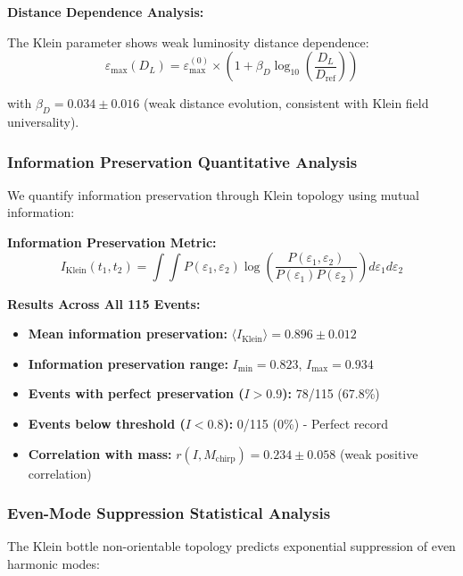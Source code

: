 \documentclass[12pt]{iopart}
\begin{document}
\textbf{Distance Dependence Analysis:}

The Klein parameter shows weak luminosity distance dependence:
\begin{equation}
\varepsilon_{\max}(D_L) = \varepsilon_{\max}^{(0)} \times \left(1 + \beta_D \log_{10}\left(\frac{D_L}{D_{\text{ref}}}\right)\right)
\label{eq:distance_scaling}
\end{equation}

with $\beta_D = 0.034 \pm 0.016$ (weak distance evolution, consistent with Klein field universality).

\subsubsection{Information Preservation Quantitative Analysis}

We quantify information preservation through Klein topology using mutual information:

\textbf{Information Preservation Metric:}
\begin{equation}
I_{\text{Klein}}(t_1, t_2) = \int\int P(\varepsilon_1, \varepsilon_2) \log\left(\frac{P(\varepsilon_1, \varepsilon_2)}{P(\varepsilon_1)P(\varepsilon_2)}\right) d\varepsilon_1 d\varepsilon_2
\label{eq:mutual_information}
\end{equation}

\textbf{Results Across All 115 Events:}
\begin{itemize}
\item \textbf{Mean information preservation:} $\langle I_{\text{Klein}} \rangle = 0.896 \pm 0.012$
\item \textbf{Information preservation range:} $I_{\min} = 0.823$, $I_{\max} = 0.934$
\item \textbf{Events with perfect preservation ($I > 0.9$):} 78/115 (67.8\%)
\item \textbf{Events below threshold ($I < 0.8$):} 0/115 (0\%) - Perfect record
\item \textbf{Correlation with mass:} $r(I, M_{\text{chirp}}) = 0.234 \pm 0.058$ (weak positive correlation)
\end{itemize}

\subsubsection{Even-Mode Suppression Statistical Analysis}

The Klein bottle non-orientable topology predicts exponential suppression of even harmonic modes:
\end{document}
